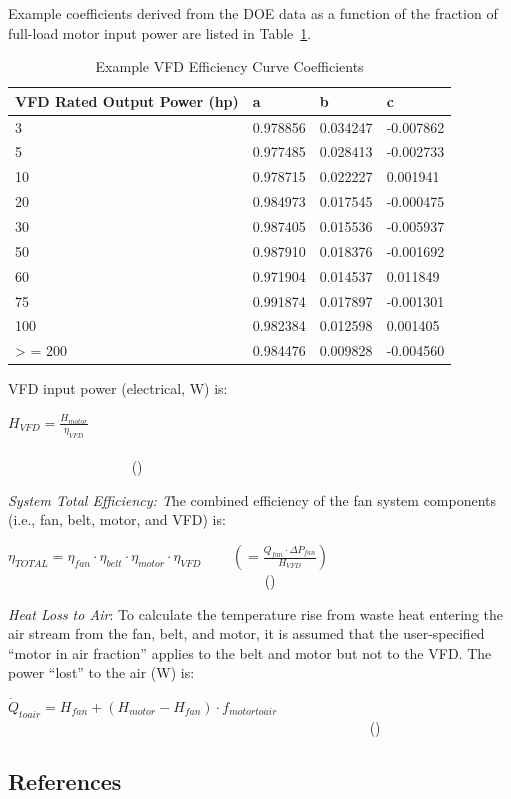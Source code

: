 Example coefficients derived from the DOE data as a function of the fraction of full-load motor input power are listed in Table~\ref{table:example-vfd-efficiency-curve-coefficients}.

\begin{longtable}[c]{@{}llll@{}}
\caption{Example VFD Efficiency Curve Coefficients \protect \label{table:example-vfd-efficiency-curve-coefficients}}\\
\toprule 
VFD Rated Output Power (hp) & a & b & c \tabularnewline \midrule
\endhead
3 & 0.978856 & 0.034247 & -0.007862 \tabularnewline
5 & 0.977485 & 0.028413 & -0.002733 \tabularnewline
10 & 0.978715 & 0.022227 & 0.001941 \tabularnewline
20 & 0.984973 & 0.017545 & -0.000475 \tabularnewline
30 & 0.987405 & 0.015536 & -0.005937 \tabularnewline
50 & 0.987910 & 0.018376 & -0.001692 \tabularnewline
60 & 0.971904 & 0.014537 & 0.011849 \tabularnewline
75 & 0.991874 & 0.017897 & -0.001301 \tabularnewline
100 & 0.982384 & 0.012598 & 0.001405 \tabularnewline
>  = 200 & 0.984476 & 0.009828 & -0.004560 \tabularnewline
\bottomrule
\end{longtable}

VFD input power (electrical, W) is:

\({H_{VFD}} = \frac{{{H_{motor}}}}{{{\eta_{VFD}}}}\) ~~~~~~~~~~~~~~~~~~~~~~~~~~~~~~~~~~~~~~~~~~~~~~~~~~~~~~~~~~~~~~~~~~~~~~~~~~~~~~~~~~~~~~~~~ ()

\emph{System Total Efficiency: T}he combined efficiency of the fan system components (i.e., fan, belt, motor, and VFD) is:

\({\eta_{TOTAL}} = {\eta_{fan}} \cdot {\eta_{belt}} \cdot {\eta_{motor}} \cdot {\eta_{VFD}}\) ~~~ \(\left( { = \frac{{{Q_{fan}} \cdot \Delta {P_{fan}}}}{{{H_{VFD}}}}} \right)\) ~~~~~~~~~~~~~~~~~~~~~~~~~~~~~~~~~~~~ ()

\emph{Heat Loss to Air}: To calculate the temperature rise from waste heat entering the air stream from the fan, belt, and motor, it is assumed that the user-specified ``motor in air fraction'' applies to the belt and motor but not to the VFD. The power ``lost'' to the air (W) is:

\({\dot Q_{toair}} = {H_{fan}} + \left( {{H_{motor}} - {H_{fan}}} \right) \cdot {f_{motortoair}}\) ~~~~~~~~~~~~~~~~~~~~~~~~~~~~~~~~~~~~~~~~~~~~~~~~~~~ ()

\subsection{References}\label{references-002}

